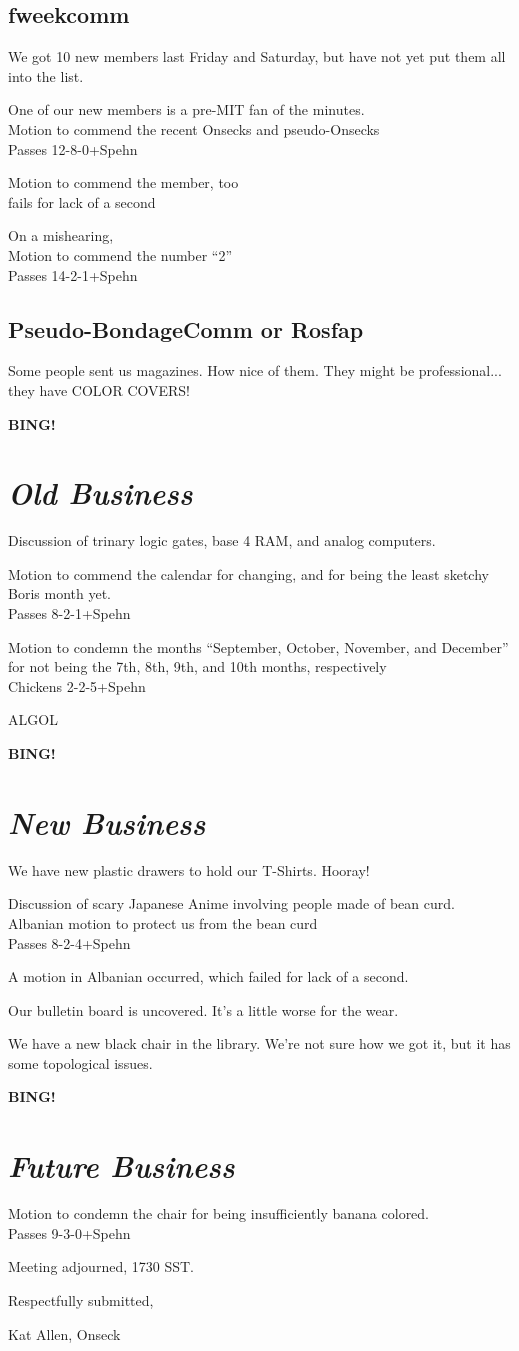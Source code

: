 \documentclass[10pt]{article}
\newcommand{\bing}{{\bf BING!} }
\newcommand{\goto}[1]{\bing \vskip 12pt \section*{{\em{#1}}}}
\begin{document}
\subsection*{fweekcomm}
We got 10 new members last Friday and Saturday, but have not yet put
them all into the list.

One of our new members is a pre-MIT fan of the minutes.\\
Motion to commend the recent Onsecks and pseudo-Onsecks\\
Passes 12-8-0+Spehn

Motion to commend the member, too\\
fails for lack of a second

On a mishearing, \\
Motion to commend the number ``2''\\
Passes 14-2-1+Spehn

\subsection*{Pseudo-BondageComm or Rosfap}
Some people sent us magazines. How nice of them.
They might be professional... they have COLOR COVERS!

\goto{Old Business}
Discussion of trinary logic gates, base 4 RAM, and analog computers.

Motion to commend the calendar for changing, and for being the least
sketchy Boris month yet.\\
Passes 8-2-1+Spehn

Motion to condemn the months ``September, October, November, and December''
for not being the 7th, 8th, 9th, and 10th months, respectively\\
Chickens 2-2-5+Spehn

ALGOL

\goto{New Business}
We have new plastic drawers to hold our T-Shirts. Hooray!

Discussion of scary Japanese Anime involving people made of bean curd.
Albanian motion to protect us from the bean curd\\
Passes 8-2-4+Spehn

A motion in Albanian occurred, which failed for lack of a second.

Our bulletin board is uncovered. It's a little worse for the wear.

We have a new black chair in the library. We're not sure how we got
it, but it has some topological issues.

\goto{Future Business}
Motion to condemn the chair for being insufficiently banana colored.\\
Passes 9-3-0+Spehn

\vspace{12pt}

\noindent
Meeting adjourned, 1730 SST.

\vspace{18pt}

\centerline{Respectfully submitted,}
\centerline{Kat Allen,  Onseck}
\end{document}
